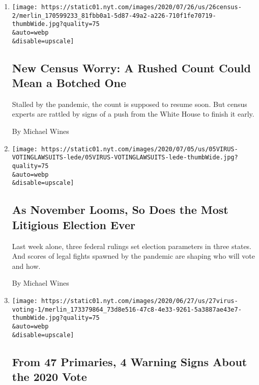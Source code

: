\begin{enumerate}
\def\labelenumi{\arabic{enumi}.}
\item
  \href{/2020/07/28/us/trump-census.html}{}

  \texttt{[image: https://static01.nyt.com/images/2020/07/26/us/26census-2/merlin\_170599233\_81fbb0a1-5d87-49a2-a226-710f1fe70719-thumbWide.jpg?quality=75\\\&auto=webp\\\&disable=upscale]}

  \hypertarget{new-census-worry-a-rushed-count-could-mean-a-botched-one}{%
  \subsection{New Census Worry: A Rushed Count Could Mean a Botched
  One}\label{new-census-worry-a-rushed-count-could-mean-a-botched-one}}

  Stalled by the pandemic, the count is supposed to resume soon. But
  census experts are rattled by signs of a push from the White House to
  finish it early.

  By Michael Wines
\item
  \href{/2020/07/07/us/2020-election-laws.html}{}

  \texttt{[image: https://static01.nyt.com/images/2020/07/05/us/05VIRUS-VOTINGLAWSUITS-lede/05VIRUS-VOTINGLAWSUITS-lede-thumbWide.jpg?quality=75\\\&auto=webp\\\&disable=upscale]}

  \hypertarget{as-november-looms-so-does-the-most-litigious-election-ever}{%
  \subsection{As November Looms, So Does the Most Litigious Election
  Ever}\label{as-november-looms-so-does-the-most-litigious-election-ever}}

  Last week alone, three federal rulings set election parameters in
  three states. And scores of legal fights spawned by the pandemic are
  shaping who will vote and how.

  By Michael Wines
\item
  \href{/2020/06/27/us/2020-primary-election-voting.html}{}

  \texttt{[image: https://static01.nyt.com/images/2020/06/27/us/27virus-voting-1/merlin\_173379864\_73d8e516-47c8-4e33-9261-5a3887ae43e7-thumbWide.jpg?quality=75\\\&auto=webp\\\&disable=upscale]}

  \hypertarget{from-47-primaries-4-warning-signs-about-the-2020-vote}{%
  \subsection{From 47 Primaries, 4 Warning Signs About the 2020
  Vote}\label{from-47-primaries-4-warning-signs-about-the-2020-vote}}


\end{enumerate}
